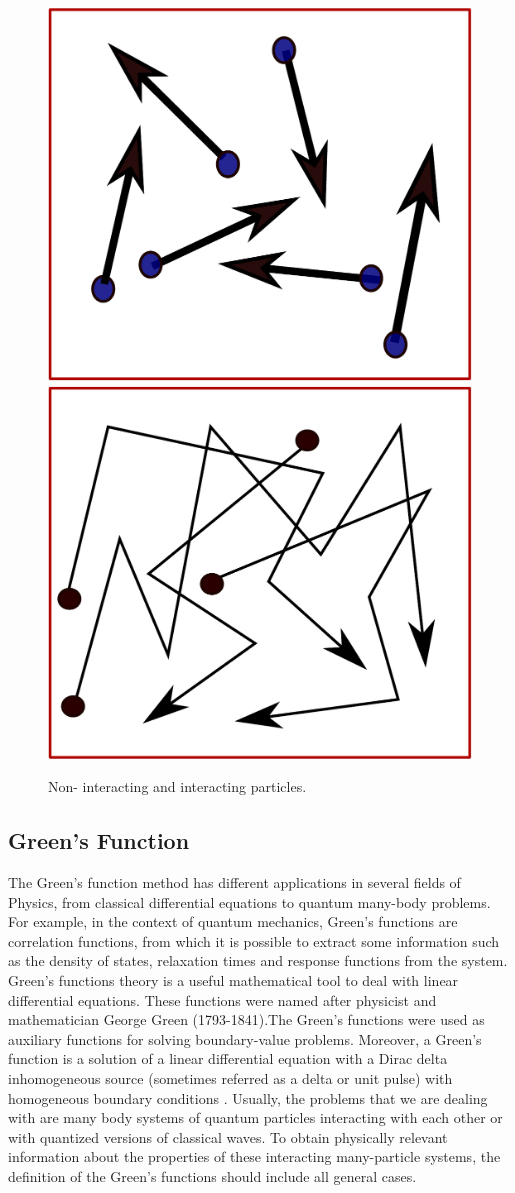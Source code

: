\begin{figure}[!htb]
  \includegraphics[width=0.5\linewidth]{fig2/non.pdf}
  \includegraphics[width=0.5\linewidth]{fig2/inter.pdf}
  \caption{Non- interacting and interacting particles.}
\label{fig:particle}
\end{figure}


\subsection{Green's Function}

The Green's function method has different applications in several fields of Physics, from classical differential equations to quantum many-body problems. For example, in the context of quantum mechanics, Green's functions are correlation functions, from which it is possible to extract some information such as the density of states, relaxation times and response functions from the system. Green's functions theory is a useful mathematical tool to deal with linear differential equations. These functions were named after physicist and mathematician George Green (1793-1841).The Green's functions were used as auxiliary functions for solving boundary-value problems. Moreover, a Green's function is a solution of a linear differential equation with a Dirac delta inhomogeneous source (sometimes referred as a delta or unit pulse) with homogeneous boundary conditions \cite{Mariana}.
Usually, the problems that we are dealing with are many body systems of quantum particles interacting with each other or with quantized versions of classical waves. To obtain physically relevant information about the properties of these interacting many-particle systems, the definition of the Green's functions should include all general cases\cite{Economou}. 

